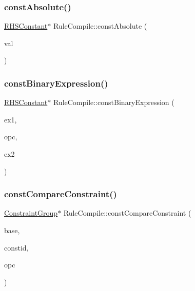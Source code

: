\mbox{\label{class_rule_compile_aaf62e66036b0f83ed603279396bbfbd4}} 
\subsubsection{\texorpdfstring{constAbsolute()}{constAbsolute()}}
{\footnotesize\ttfamily \mbox{\hyperlink{class_r_h_s_constant}{R\+H\+S\+Constant}}$\ast$ Rule\+Compile\+::const\+Absolute (\begin{DoxyParamCaption}\item[{int8 $\ast$}]{val }\end{DoxyParamCaption})}

\mbox{\label{class_rule_compile_adade34d2e9ce838fc0e171791e5412d8}} 
\subsubsection{\texorpdfstring{constBinaryExpression()}{constBinaryExpression()}}
{\footnotesize\ttfamily \mbox{\hyperlink{class_r_h_s_constant}{R\+H\+S\+Constant}}$\ast$ Rule\+Compile\+::const\+Binary\+Expression (\begin{DoxyParamCaption}\item[{\mbox{\hyperlink{class_r_h_s_constant}{R\+H\+S\+Constant}} $\ast$}]{ex1,  }\item[{\mbox{\hyperlink{opcodes_8hh_abeb7dfb0e9e2b3114e240a405d046ea7}{Op\+Code}}}]{opc,  }\item[{\mbox{\hyperlink{class_r_h_s_constant}{R\+H\+S\+Constant}} $\ast$}]{ex2 }\end{DoxyParamCaption})}

\mbox{\label{class_rule_compile_a360879b09fea5254d7944eb59b78dc30}} 
\subsubsection{\texorpdfstring{constCompareConstraint()}{constCompareConstraint()}}
{\footnotesize\ttfamily \mbox{\hyperlink{class_constraint_group}{Constraint\+Group}}$\ast$ Rule\+Compile\+::const\+Compare\+Constraint (\begin{DoxyParamCaption}\item[{\mbox{\hyperlink{class_constraint_group}{Constraint\+Group}} $\ast$}]{base,  }\item[{int4}]{constid,  }\item[{\mbox{\hyperlink{opcodes_8hh_abeb7dfb0e9e2b3114e240a405d046ea7}{Op\+Code}}}]{opc }\end{DoxyParamCaption})}

